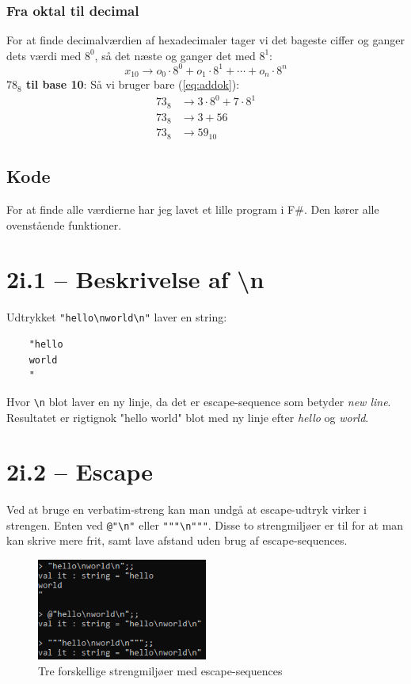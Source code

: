 \documentclass{article}
\begin{document}
\subsubsection*{Fra oktal til decimal}
For at finde decimalværdien af hexadecimaler tager vi det bageste ciffer og ganger dets værdi med $8^0$, så det næste og ganger det med $8^1$:\begin{equation}
    x_{10}\rightarrow o_0\cdot8^0+o_1\cdot8^1+\cdots+o_n\cdot8^n\label{eq:addok}
\end{equation}
\textbf{$78_8$ til base 10}: Så vi bruger bare (\ref{eq:addok}):\begin{align*}
    73_8&\rightarrow 3\cdot8^0+7\cdot8^1\\
    73_8&\rightarrow 3+56\\
    73_8&\rightarrow 59_{10}
\end{align*}
\subsection{Kode}
For at finde alle værdierne har jeg lavet et lille program i F\#. Den kører alle ovenstående funktioner.
\section*{2i.1 -- Beskrivelse af \textbackslash n}
Udtrykket \texttt{"hello\textbackslash nworld\textbackslash n"} laver en string:\begin{verbatim}
    "hello
    world
    "
\end{verbatim}
Hvor \texttt{\textbackslash n} blot laver en ny linje, da det er escape-sequence som betyder \textit{new line}. Resultatet er rigtignok "hello world" blot med ny linje efter \textit{hello} og \textit{world}. 
\section*{2i.2 -- Escape}
Ved at bruge en verbatim-streng kan man undgå at escape-udtryk virker i strengen. Enten ved \texttt{@"\textbackslash n"} eller \texttt{"{}"{}"{}\textbackslash n"{}"{}"}. Disse to strengmiljøer er til for at man kan skrive mere frit, samt lave afstand uden brug af escape-sequences.
\begin{figure}[H]
    \centering
    \includegraphics[width=0.5\textwidth]{cmd_dHJkJPD6Jk.png}
    \caption{Tre forskellige strengmiljøer med escape-sequences}
    \label{fig:escapeenv}
\end{figure}
\end{document}
